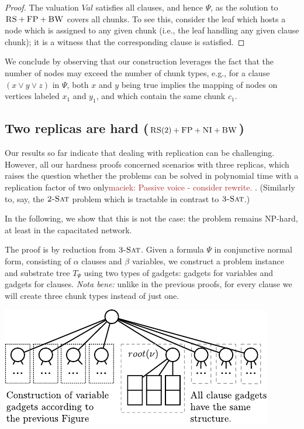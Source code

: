 \documentclass[9pt]{sigcomm-alternate}
\newcommand{\maciek}[1]{\textcolor{brown}{maciek: #1}}
\newcommand{\clauses}{\alpha}
\newcommand{\vars}{\beta}
\newcommand{\CC}{\textsc{NI}}
\newcommand{\FP}{\textsc{FP}}
\newcommand{\RS}{\textsc{RS}}
\newcommand{\BW}{\textsc{BW}}
\newcommand{\TSAT}{\textsc{3-Sat}}
\newcommand{\ZSAT}{\textsc{2-Sat}}
\newcommand{\Formula}{\ensuremath{\Psi}}
\newcommand{\Val}{\ensuremath{Val}}
\begin{document}
\begin{appendix}
\begin{proof}
The valuation $\Val$ satisfies all clauses, and hence $\Formula$,
as the solution to $\RS+\FP+\BW$ covers all chunks. To see this,
consider the leaf which
hosts a node which is assigned to any given chunk (i.e.,
the leaf handling any given clause chunk);
it is a witness that the corresponding clause is satisfied.
\end{proof}

We conclude by observing that our construction leverages the fact that
the number of nodes may exceed the number of chunk types, e.g.,
for a clause $(x \vee y \vee z)$ in
$\Formula$, both $x$ and $y$ being true implies the
mapping of nodes on vertices labeled $x_1$ and $y_1$, and which contain the
same chunk $c_1$.


\subsection{Two replicas are hard
  ($\RS(2)+\FP+\CC+\BW$)}\label{ssec:two}

Our results so far indicate that dealing with replication can be challenging.
However, all our hardness proofs concerned scenarios with three replicas,
which raises the question whether the problems can be solved in polynomial time
with a replication factor of two only\maciek{Passive voice - consider rewrite.}
. (Similarly to, say, the $\ZSAT$ problem
which is tractable in contrast to $\TSAT$.)

In the following, we show that this is not the case: the problem remains
NP-hard, at least in the capacitated network.

The proof is by reduction from $\TSAT$. Given a formula $\Formula$ in
conjunctive normal form, consisting of $\clauses$ clauses and $\vars$ variables, we construct a problem instance and substrate tree
$T_{\Formula}$ using two types of gadgets: gadgets for variables and
gadgets for clauses. \emph{Nota bene:}
unlike in the previous proofs, for every clause we will create three chunk types instead of just one.

\includegraphics{figs/construction_2replica}


\end{appendix}
\end{document}
